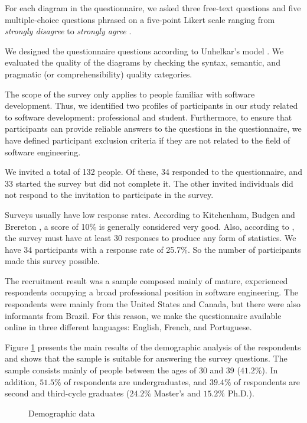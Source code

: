 \documentclass[sigconf]{acmart}
\begin{document}
For each diagram in the questionnaire, we asked three free-text questions and five multiple-choice questions phrased on a five-point Likert scale \citep{jamieson2005} ranging from \textit{strongly disagree} to \textit{strongly agree }. 

We designed the questionnaire questions according to Unhelkar's model \cite{unhelkar2005}. We evaluated the quality of the diagrams by checking the syntax, semantic, and pragmatic (or comprehensibility) quality categories.

The scope of the survey only applies to people familiar with software development. Thus, we identified two profiles of participants in our study related to software development:  professional and student. Furthermore, to ensure that participants can provide reliable answers to the questions in the questionnaire, we have defined participant exclusion criteria if they are not related to the field of software engineering.

We invited a total of 132 people. Of these, 34 responded to the questionnaire, and 33 started the survey but did not complete it. The other invited individuals did not respond to the invitation to participate in the survey. 

Surveys usually have low response rates. According to Kitchenham, Budgen and Brereton \cite{kitchenham2015}, a score of 10\% is generally considered very good. Also, according to \cite{kitchenham2015}, the survey must have at least 30 responses to produce any form of statistics. We have 34 participants with a response rate of 25.7\%. So the number of participants made this survey possible.

The recruitment result was a sample composed mainly of mature, experienced respondents occupying a broad professional position in software engineering. The respondents were mainly from the United States and Canada, but there were also informants from Brazil. For this reason, we make the questionnaire available online in three different languages: English, French, and Portuguese.

Figure \ref{fig:demographic-data} presents the main results of the demographic analysis of the respondents and shows that the sample is suitable for answering the survey questions. The sample consists mainly of people between the ages of 30 and 39 ($41.2\%$). In addition, $51.5\%$ of respondents are undergraduates, and $39.4\%$ of respondents are second and third-cycle graduates ($24.2\%$ Master's and $15.2\%$ Ph.D.).

\begin{figure}[t]
    \centering
    
    \caption{Demographic data}
    \label{fig:demographic-data}
\end{figure}
\end{document}
